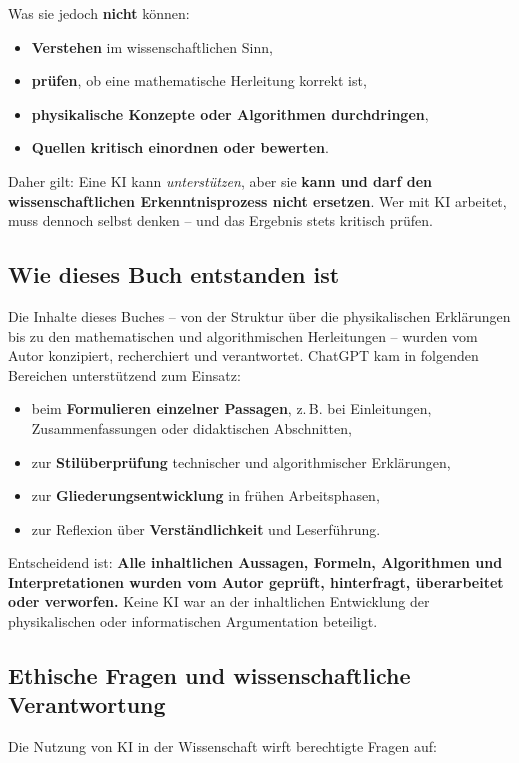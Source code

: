 Was sie jedoch \textbf{nicht} können:
\begin{itemize}
	\item \textbf{Verstehen} im wissenschaftlichen Sinn,
	\item \textbf{prüfen}, ob eine mathematische Herleitung korrekt ist,
	\item \textbf{physikalische Konzepte oder Algorithmen durchdringen},
	\item \textbf{Quellen kritisch einordnen oder bewerten}.
\end{itemize}

Daher gilt: Eine KI kann \emph{unterstützen}, aber sie \textbf{kann und darf den wissenschaftlichen Erkenntnisprozess nicht ersetzen}. Wer mit KI arbeitet, muss dennoch selbst denken – und das Ergebnis stets kritisch prüfen.

\subsection*{Wie dieses Buch entstanden ist}
Die Inhalte dieses Buches – von der Struktur über die physikalischen Erklärungen bis zu den mathematischen und algorithmischen Herleitungen – wurden vom Autor konzipiert, recherchiert und verantwortet. ChatGPT kam in folgenden Bereichen unterstützend zum Einsatz:

\begin{itemize}
	\item beim \textbf{Formulieren einzelner Passagen}, z.\,B. bei Einleitungen, Zusammenfassungen oder didaktischen Abschnitten,
	\item zur \textbf{Stilüberprüfung} technischer und algorithmischer Erklärungen,
	\item zur \textbf{Gliederungsentwicklung} in frühen Arbeitsphasen,
	\item zur Reflexion über \textbf{Verständlichkeit} und Leserführung.
\end{itemize}

Entscheidend ist: \textbf{Alle inhaltlichen Aussagen, Formeln, Algorithmen und Interpretationen wurden vom Autor geprüft, hinterfragt, überarbeitet oder verworfen.} Keine KI war an der inhaltlichen Entwicklung der physikalischen oder informatischen Argumentation beteiligt.

\subsection*{Ethische Fragen und wissenschaftliche Verantwortung}
Die Nutzung von KI in der Wissenschaft wirft berechtigte Fragen auf:


